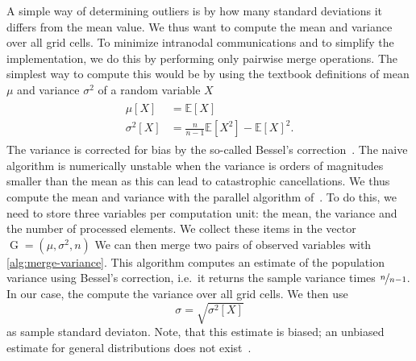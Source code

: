 \newcommand{\gobs}{\operatorname{G}}
\newcommand{\mean}{\mu}
\newcommand{\std}{\sigma}
\newcommand{\variance}{\std^2}
\newcommand{\gobsCount}{n}
A simple way of determining outliers is by how many standard deviations it differs from the mean value.
We thus want to compute the mean and variance over all grid cells.
To minimize intranodal communications and to simplify the implementation, we do this by performing only pairwise merge operations.
The simplest way to compute this would be by using the textbook definitions of mean $\mean$ and variance $\variance$ of a random variable $X$
\newcommand{\expectation}{\mathbb{E}}
\begin{align}
  \begin{split}
    \mean [X] &= \expectation \left[ X \right]\\
    \variance [X] &= \frac{n}{n-1} \expectation \left[ X^2 \right] - \expectation \left[ X \right]^2.
  \end{split}
\end{align}
The variance is corrected for bias by the so-called Bessel's correction~\cite{holtzman1950unbiased}.
The naive algorithm is numerically unstable when the variance is orders of magnitudes smaller than the mean as this can lead to catastrophic cancellations.
We thus compute the mean and variance with the parallel algorithm of~\cite{chan1982updating}.
To do this, we need to store three variables per computation unit:
the mean, the variance and the number of processed elements.
We collect these items in the vector $\gobs = (\mean, \variance, \gobsCount)$
We can then merge two pairs of observed variables with \cref{alg:merge-variance}.
This algorithm computes an estimate of the population variance using Bessel's correction, i.e.\ it returns the sample variance times $\nicefrac{n}{n-1}$.
In our case, the compute the variance over all grid cells.
We then use
\begin{equation}
  \label{eq:sample-std}
 \sigma = \sqrt{\variance[X]} 
\end{equation}
as sample standard deviaton.
Note, that this estimate is biased; an unbiased estimate for general distributions does not exist~\cite{holtzman1950unbiased}.
